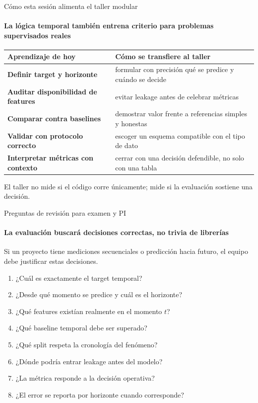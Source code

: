 \documentclass[aspectratio=169,11pt]{beamer}  %
\newcommand{\hrow}{\rowcolor{mlcream}}
\begin{document}
\begin{frame}{Cómo esta sesión alimenta el taller modular}
\framesubtitle{La lógica temporal también entrena criterio para problemas supervisados reales}
\centering
\begin{tabular}{@{}l P{0.45\textwidth}@{}}
\toprule
\hrow \textbf{Aprendizaje de hoy} & Cómo se transfiere al taller\\
\midrule
\textbf{Definir target y horizonte} & formular con precisión qué se predice y cuándo se decide\\
\textbf{Auditar disponibilidad de features} & evitar leakage antes de celebrar métricas\\
\textbf{Comparar contra baselines} & demostrar valor frente a referencias simples y honestas\\
\textbf{Validar con protocolo correcto} & escoger un esquema compatible con el tipo de dato\\
\textbf{Interpretar métricas con contexto} & cerrar con una decisión defendible, no solo con una tabla\\
\bottomrule
\end{tabular}

\vspace{0.4em}
El taller no mide si el código corre únicamente; mide si la evaluación sostiene una decisión.
\end{frame}

\begin{frame}{Preguntas de revisión para examen y PI}
\framesubtitle{La evaluación buscará decisiones correctas, no trivia de librerías}
\begin{taskbox}
Si un proyecto tiene mediciones secuenciales o predicción hacia futuro, el equipo debe justificar estas decisiones.
\end{taskbox}
\begin{enumerate}\small
\item ¿Cuál es exactamente el target temporal?
\item ¿Desde qué momento se predice y cuál es el horizonte?
\item ¿Qué features existían realmente en el momento $t$?
\item ¿Qué baseline temporal debe ser superado?
\item ¿Qué split respeta la cronología del fenómeno?
\item ¿Dónde podría entrar leakage antes del modelo?
\item ¿La métrica responde a la decisión operativa?
\item ¿El error se reporta por horizonte cuando corresponde?
\end{enumerate}
\end{frame}
\end{document}
